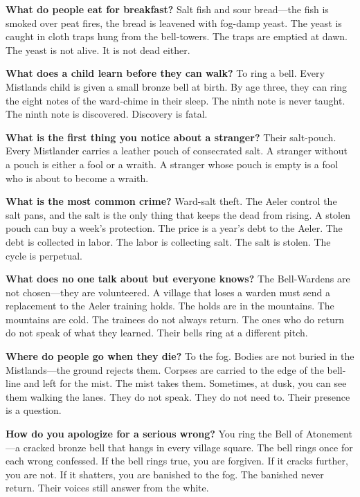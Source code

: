 \vspace{1em}

\begin{almanac}
\textbf{What do people eat for breakfast?} Salt fish and sour bread---the fish is smoked over peat fires, the bread is leavened with fog-damp yeast. The yeast is caught in cloth traps hung from the bell-towers. The traps are emptied at dawn. The yeast is not alive. It is not dead either.

\textbf{What does a child learn before they can walk?} To ring a bell. Every Mistlands child is given a small bronze bell at birth. By age three, they can ring the eight notes of the ward-chime in their sleep. The ninth note is never taught. The ninth note is discovered. Discovery is fatal.

\textbf{What is the first thing you notice about a stranger?} Their salt-pouch. Every Mistlander carries a leather pouch of consecrated salt. A stranger without a pouch is either a fool or a wraith. A stranger whose pouch is empty is a fool who is about to become a wraith.

\textbf{What is the most common crime?} Ward-salt theft. The Aeler control the salt pans, and the salt is the only thing that keeps the dead from rising. A stolen pouch can buy a week's protection. The price is a year's debt to the Aeler. The debt is collected in labor. The labor is collecting salt. The salt is stolen. The cycle is perpetual.

\textbf{What does no one talk about but everyone knows?} The Bell-Wardens are not chosen---they are volunteered. A village that loses a warden must send a replacement to the Aeler training holds. The holds are in the mountains. The mountains are cold. The trainees do not always return. The ones who do return do not speak of what they learned. Their bells ring at a different pitch.

\textbf{Where do people go when they die?} To the fog. Bodies are not buried in the Mistlands---the ground rejects them. Corpses are carried to the edge of the bell-line and left for the mist. The mist takes them. Sometimes, at dusk, you can see them walking the lanes. They do not speak. They do not need to. Their presence is a question.

\textbf{How do you apologize for a serious wrong?} You ring the Bell of Atonement---a cracked bronze bell that hangs in every village square. The bell rings once for each wrong confessed. If the bell rings true, you are forgiven. If it cracks further, you are not. If it shatters, you are banished to the fog. The banished never return. Their voices still answer from the white.


\end{almanac}
